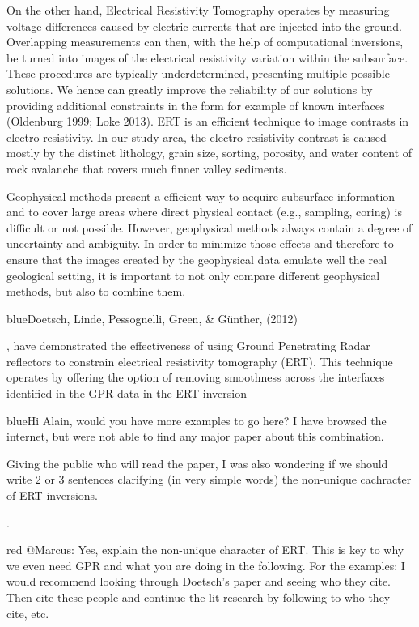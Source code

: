 \documentclass[utf8]{frontiersSCNS}
\newcommand{\COMON}{\begin{color}{blue}}
\newcommand{\COMOFF}{\end{color}}
\newcommand{\alon}{\begin{color}{red}}
\newcommand{\aloff}{\end{color}}
\begin{document}
On the other hand, Electrical Resistivity Tomography operates by measuring voltage differences caused by electric currents that are injected into the ground. Overlapping measurements can then, with the help of computational inversions, be turned into images of the electrical resistivity variation within the subsurface. These procedures are typically underdetermined, presenting multiple possible solutions. We hence can greatly improve the reliability of our solutions by providing additional constraints in the form for example of known interfaces (Oldenburg 1999; Loke 2013). ERT is an efficient technique to image contrasts in electro resistivity. In our study area, the electro resistivity contrast is caused mostly by the distinct  lithology, grain size, sorting, porosity, and water content  of rock avalanche that covers much finner valley sediments. 


Geophysical methods present a efficient way to acquire subsurface information and  to cover large areas where direct physical contact (e.g., sampling, coring) is difficult or not possible. However, geophysical methods always contain a degree of  uncertainty and ambiguity. In order to minimize those effects and therefore to ensure that the images created by the geophysical data emulate well the real geological setting, it is important to not only compare different geophysical methods, but also to combine them. \COMON Doetsch, Linde, Pessognelli, Green, \& G\"unther, (2012)\COMOFF, have demonstrated the effectiveness of using Ground Penetrating Radar reflectors to constrain electrical resistivity tomography (ERT). This technique operates by offering the option of removing smoothness across the interfaces identified in the GPR data in the ERT inversion 

\COMON Hi Alain, would you have more examples to go here? I have browsed the internet, but were not able to find any major paper about this combination. 

Giving the public who will read the paper, I was also wondering if
we should write 2 or 3 sentences clarifying (in very simple words)
the  non-unique cachracter of ERT inversions.\COMOFF.

\alon
@Marcus: Yes, explain the non-unique character of ERT. This is key to
why we even need GPR and what you are doing in the following. For the
examples: I would recommend looking through Doetsch's paper and seeing
who they cite. Then cite these people and continue the lit-research by
following to who they cite, etc. 
\aloff
\end{document}
